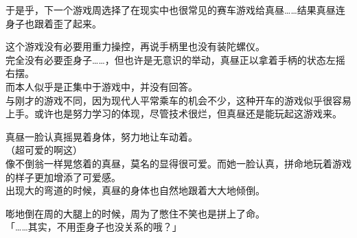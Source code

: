 于是乎，下一个游戏周选择了在现实中也很常见的赛车游戏给真昼……结果真昼连身子也跟着歪了起来。

这个游戏没有必要用重力操控，再说手柄里也没有装陀螺仪。\\

完全没有必要歪身子……，但也许是无意识的举动，真昼正以拿着手柄的状态左摇右摆。\\

而本人似乎是正集中于游戏中，并没有回答。\\

与刚才的游戏不同，因为现代人平常乘车的机会不少，这种开车的游戏似乎很容易上手。或许也是努力学习的体现，尽管技术很烂，但真昼还是能玩起这游戏来。

真昼一脸认真摇晃着身体，努力地让车动着。\\

（超可爱的啊这）\\

像不倒翁一样晃悠着的真昼，莫名的显得很可爱。而她一脸认真，拼命地玩着游戏的样子更加增添了可爱感。\\

出现大的弯道的时候，真昼的身体也自然地跟着大大地倾倒。

嘭地倒在周的大腿上的时候，周为了憋住不笑也是拼上了命。\\

「……其实，不用歪身子也没关系的哦？」


